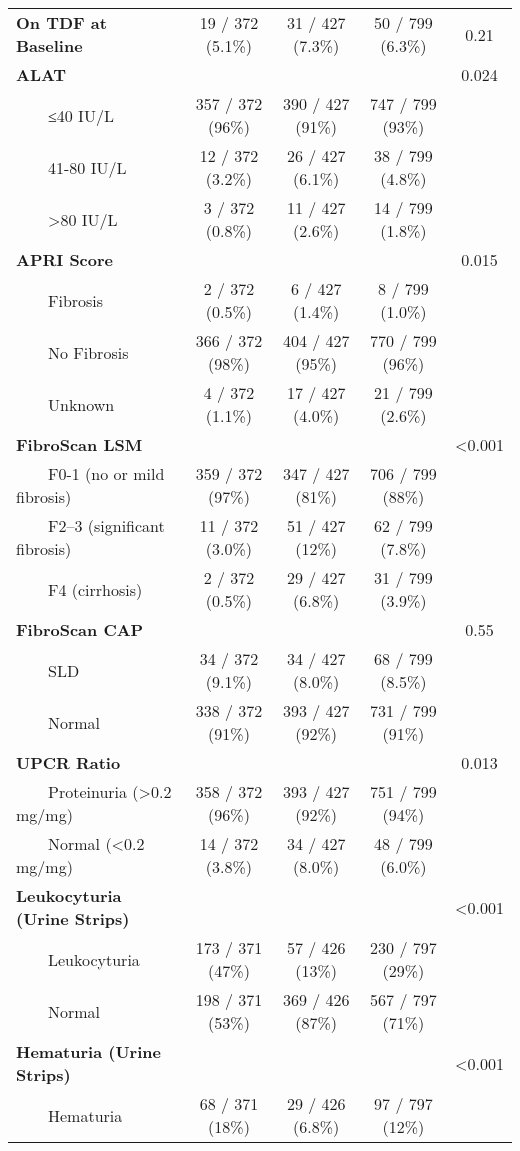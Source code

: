 \documentclass[
]{article}
\begin{document}
\begin{longtable}{lcccc}
\textbf{On TDF at Baseline} & 19 / 372 (5.1\%) & 31 / 427 (7.3\%) & 50 / 799 (6.3\%) & 0.21 \\ 
\textbf{ALAT} &  &  &  & 0.024 \\ 
    ≤40 IU/L & 357 / 372 (96\%) & 390 / 427 (91\%) & 747 / 799 (93\%) &  \\ 
    41-80 IU/L & 12 / 372 (3.2\%) & 26 / 427 (6.1\%) & 38 / 799 (4.8\%) &  \\ 
    >80 IU/L & 3 / 372 (0.8\%) & 11 / 427 (2.6\%) & 14 / 799 (1.8\%) &  \\ 
\textbf{APRI Score} &  &  &  & 0.015 \\ 
    Fibrosis & 2 / 372 (0.5\%) & 6 / 427 (1.4\%) & 8 / 799 (1.0\%) &  \\ 
    No Fibrosis & 366 / 372 (98\%) & 404 / 427 (95\%) & 770 / 799 (96\%) &  \\ 
    Unknown & 4 / 372 (1.1\%) & 17 / 427 (4.0\%) & 21 / 799 (2.6\%) &  \\ 
\textbf{FibroScan LSM} &  &  &  & <0.001 \\ 
    F0-1 (no or mild fibrosis) & 359 / 372 (97\%) & 347 / 427 (81\%) & 706 / 799 (88\%) &  \\ 
    F2–3 (significant fibrosis) & 11 / 372 (3.0\%) & 51 / 427 (12\%) & 62 / 799 (7.8\%) &  \\ 
    F4 (cirrhosis) & 2 / 372 (0.5\%) & 29 / 427 (6.8\%) & 31 / 799 (3.9\%) &  \\ 
\textbf{FibroScan CAP} &  &  &  & 0.55 \\ 
    SLD & 34 / 372 (9.1\%) & 34 / 427 (8.0\%) & 68 / 799 (8.5\%) &  \\ 
    Normal & 338 / 372 (91\%) & 393 / 427 (92\%) & 731 / 799 (91\%) &  \\ 
\textbf{UPCR Ratio} &  &  &  & 0.013 \\ 
    Proteinuria (>0.2 mg/mg) & 358 / 372 (96\%) & 393 / 427 (92\%) & 751 / 799 (94\%) &  \\ 
    Normal (<0.2 mg/mg) & 14 / 372 (3.8\%) & 34 / 427 (8.0\%) & 48 / 799 (6.0\%) &  \\ 
\textbf{Leukocyturia (Urine Strips)} &  &  &  & <0.001 \\ 
    Leukocyturia & 173 / 371 (47\%) & 57 / 426 (13\%) & 230 / 797 (29\%) &  \\ 
    Normal & 198 / 371 (53\%) & 369 / 426 (87\%) & 567 / 797 (71\%) &  \\ 
\textbf{Hematuria (Urine Strips)} &  &  &  & <0.001 \\ 
    Hematuria & 68 / 371 (18\%) & 29 / 426 (6.8\%) & 97 / 797 (12\%) &  \\ 

\end{longtable}
\end{document}
